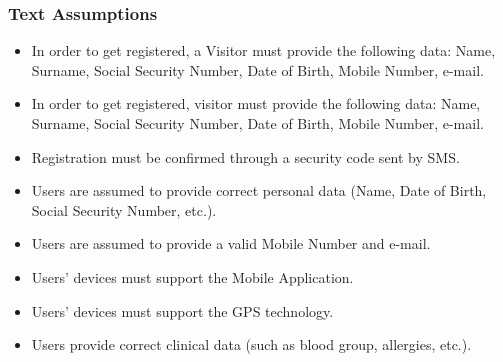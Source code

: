 \documentclass[12pt,a4paper]{article}
\begin{document}
		\subsubsection{Text Assumptions}
			\begin{itemize}
				\item In order to get registered, a Visitor must provide the following data: Name, Surname, Social Security Number, Date of Birth, Mobile Number, e-mail.
				\item In order to get registered, visitor must provide the following data: Name, Surname, Social Security Number, Date of Birth, Mobile Number, e-mail.
				\item Registration must be confirmed through a security code sent by SMS.
				\item Users are assumed to provide correct personal data (Name, Date of Birth, Social Security Number, etc.).
				\item Users are assumed to provide a valid Mobile Number and e-mail.
				\item Users' devices must support the Mobile Application.
				\item Users' devices must support the GPS technology.
				\item Users provide correct clinical data (such as blood group, allergies, etc.).
			\end{itemize}
\end{document}
